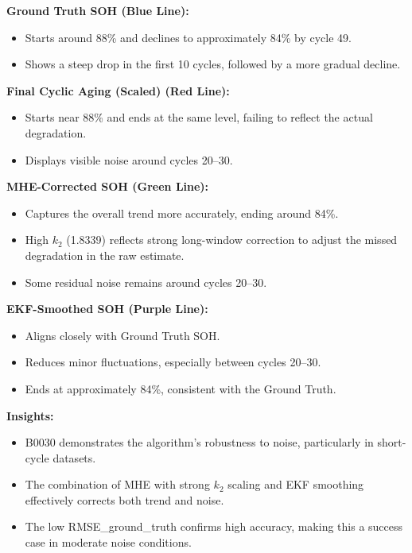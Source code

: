 \vspace{0.5em}
\textbf{Ground Truth SOH (Blue Line):}
\begin{itemize}
    \item Starts around 88\% and declines to approximately 84\% by cycle 49.
    \item Shows a steep drop in the first 10 cycles, followed by a more gradual decline.
\end{itemize}

\vspace{0.5em}
\textbf{Final Cyclic Aging (Scaled) (Red Line):}
\begin{itemize}
    \item Starts near 88\% and ends at the same level, failing to reflect the actual degradation.
    \item Displays visible noise around cycles 20--30.
\end{itemize}

\vspace{0.5em}
\textbf{MHE-Corrected SOH (Green Line):}
\begin{itemize}
    \item Captures the overall trend more accurately, ending around 84\%.
    \item High $k_2$ (1.8339) reflects strong long-window correction to adjust the missed degradation in the raw estimate.
    \item Some residual noise remains around cycles 20--30.
\end{itemize}

\vspace{0.5em}
\textbf{EKF-Smoothed SOH (Purple Line):}
\begin{itemize}
    \item Aligns closely with Ground Truth SOH.
    \item Reduces minor fluctuations, especially between cycles 20--30.
    \item Ends at approximately 84\%, consistent with the Ground Truth.
\end{itemize}

\vspace{0.5em}
\textbf{Insights:}
\begin{itemize}
    \item B0030 demonstrates the algorithm’s robustness to noise, particularly in short-cycle datasets.
    \item The combination of MHE with strong $k_2$ scaling and EKF smoothing effectively corrects both trend and noise.
    \item The low RMSE\_ground\_truth confirms high accuracy, making this a success case in moderate noise conditions.
\end{itemize}


